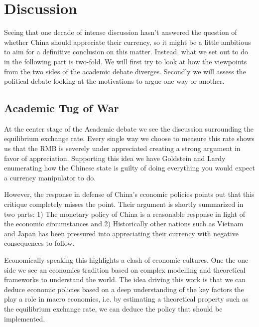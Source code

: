 \section{Discussion}





Seeing that one decade of intense discussion hasn't answered the 
question of whether China should appreciate their currency, so it might 
be a little ambitious to aim for a definitive conclusion on this matter.  
Instead, what we set out to do in the following part is two-fold. We 
will first try to look at how the viewpoints from the two sides of the 
academic debate diverges. Secondly we will assess the political debate 
looking at the motivations to argue one way or another.

\subsection{Academic Tug of War}

At the center stage of the Academic debate we see the discussion 
surrounding the equilibrium exchange rate. Every single way we choose to 
measure this rate shows us that the RMB is severely under appreciated 
creating a strong argument in favor of appreciation. Supporting this 
idea we have Goldstein and Lardy enumerating how the Chinese state is 
guilty of doing everything you would expect a currency manipulator to 
do.

However, the response in defense of China's economic policies points out 
that this critique completely misses the point. Their argument is 
shortly summarized in two parts: 1) The monetary policy of China is a 
reasonable response in light of the economic circumstances and 2) 
Historically other nations such as Vietnam and Japan has been pressured 
into appreciating their currency with negative consequences to follow.

Economically speaking this highlights a clash of economic cultures. One 
the one side we see an economics tradition based on complex modelling 
and theoretical frameworks to understand the world. The idea driving 
this work is that we can deduce economic policies based on a deep 
understanding of the key factors the play a role in macro economics, 
i.e. by estimating a theoretical property such as the equilibrium 
exchange rate, we can deduce the policy that should be implemented.  

